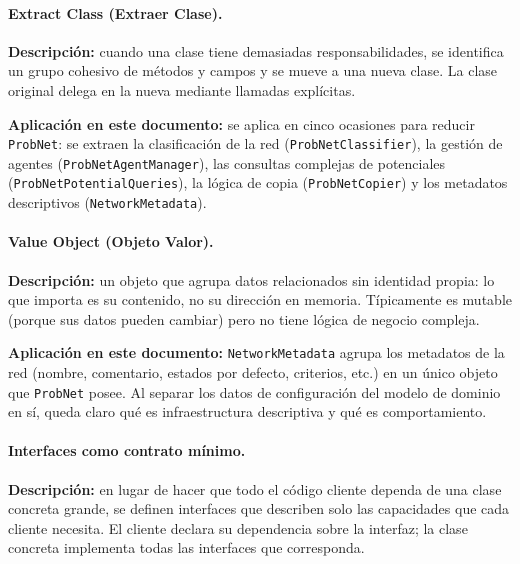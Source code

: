 \documentclass[11pt,a4paper]{article}
\newcommand{\code}[1]{\texttt{#1}}
\begin{document}
\paragraph{Extract Class (Extraer Clase).}

\textbf{Descripción:} cuando una clase tiene demasiadas
responsabilidades, se identifica un grupo cohesivo de métodos y campos
y se mueve a una nueva clase.  La clase original delega en la nueva
mediante llamadas explícitas.

\textbf{Aplicación en este documento:} se aplica en cinco ocasiones para
reducir \code{ProbNet}: se extraen la clasificación de la red
(\code{ProbNetClassifier}), la gestión de agentes
(\code{ProbNetAgentManager}), las consultas complejas de potenciales
(\code{ProbNetPotentialQueries}), la lógica de copia
(\code{ProbNetCopier}) y los metadatos descriptivos
(\code{NetworkMetadata}).

\label{sec:fund-value-object}
\paragraph{Value Object (Objeto Valor).}

\textbf{Descripción:} un objeto que agrupa datos relacionados sin
identidad propia: lo que importa es su contenido, no su dirección en
memoria.  Típicamente es mutable (porque sus datos pueden cambiar) pero
no tiene lógica de negocio compleja.

\textbf{Aplicación en este documento:} \code{NetworkMetadata} agrupa
los metadatos de la red (nombre, comentario, estados por defecto,
criterios, etc.) en un único objeto que \code{ProbNet} posee.  Al
separar los datos de configuración del modelo de dominio en sí, queda
claro qué es infraestructura descriptiva y qué es comportamiento.

\label{sec:fund-interface-seg}
\paragraph{Interfaces como contrato mínimo.}

\textbf{Descripción:} en lugar de hacer que todo el código cliente
dependa de una clase concreta grande, se definen interfaces que
describen solo las capacidades que cada cliente necesita.  El cliente
declara su dependencia sobre la interfaz; la clase concreta implementa
todas las interfaces que corresponda.
\end{document}
